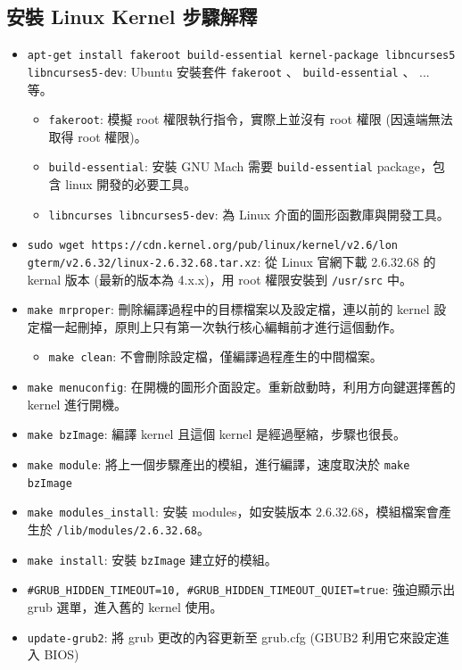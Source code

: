 \documentclass{res}
\begin{document}
 


\address{\\R03922106 蔡佑隆 unzledick@yahoo.com.tw\\ R04922067 楊翔雲 morris821028@gmail.com}

\begin{resume}

\section{\large 安裝 Linux Kernel 步驟解釋}
\begin{itemize}[leftmargin=-1.em]
	\item \lstinline{apt-get install fakeroot build-essential kernel-package libncurses5 libncurses5-dev}: 
	Ubuntu 安裝套件 \lstinline{fakeroot} 、 \lstinline{build-essential} 、 ... 等。
	\begin{itemize}
		\item \lstinline{fakeroot}: 模擬 root 權限執行指令，實際上並沒有 root 權限 (因遠端無法取得 root 權限)。
		\item \lstinline{build-essential}: 安裝 GNU Mach 需要 \lstinline{build-essential} package，包含 linux 開發的必要工具。
		\item \lstinline{libncurses libncurses5-dev}: 為 Linux 介面的圖形函數庫與開發工具。
	\end{itemize}
	\item \lstinline{sudo wget https://cdn.kernel.org/pub/linux/kernel/v2.6/lon gterm/v2.6.32/linux-2.6.32.68.tar.xz}: 從 Linux 官網下載 2.6.32.68 的 kernal 版本 (最新的版本為 4.x.x)，用 root 權限安裝到 \lstinline{/usr/src} 中。
	\item \lstinline{make mrproper}: 刪除編譯過程中的目標檔案以及設定檔，連以前的 kernel 設定檔一起刪掉，原則上只有第一次執行核心編輯前才進行這個動作。
		\begin{itemize}
			\item \lstinline{make clean}: 不會刪除設定檔，僅編譯過程產生的中間檔案。
		\end{itemize}
	\item \lstinline{make menuconfig}: 在開機的圖形介面設定。重新啟動時，利用方向鍵選擇舊的 kernel 進行開機。
	\item \lstinline{make bzImage}: 編譯 kernel 且這個 kernel 是經過壓縮，步驟也很長。
	\item \lstinline{make module}: 將上一個步驟產出的模組，進行編譯，速度取決於 \lstinline{make bzImage}
	\item \lstinline{make modules_install}: 安裝 modules，如安裝版本 2.6.32.68，模組檔案會產生於 \lstinline{/lib/modules/2.6.32.68}。
	\item \lstinline{make install}: 安裝 \lstinline{bzImage} 建立好的模組。
	\item  \lstinline{#GRUB_HIDDEN_TIMEOUT=10, #GRUB_HIDDEN_TIMEOUT_QUIET=true}: 強迫顯示出 grub 選單，進入舊的 kernel 使用。
	\item \lstinline{update-grub2}: 將 grub 更改的內容更新至 grub.cfg (GBUB2 利用它來設定進入 BIOS)
\end{itemize}



\end{resume}
\end{document}
